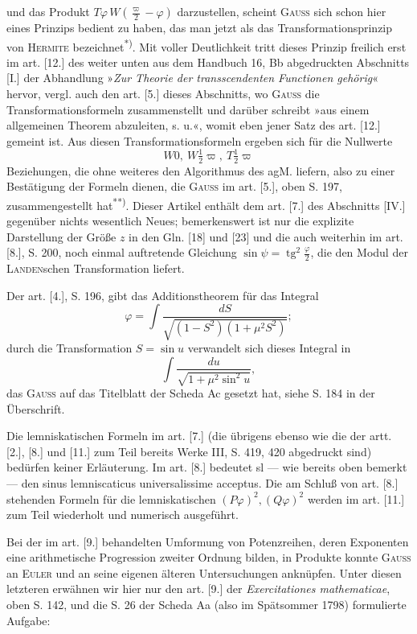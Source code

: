 \noindent und das Produkt $T\varphi\,W\left(\frac\varpi2-\varphi\right)$ darzustellen, scheint \textsc{Gauss} sich schon hier eines Prinzips bedient zu haben, das man jetzt als das Transformationsprinzip von \textsc{Hermite} bezeichnet\textsuperscript{*)}. Mit voller Deutlichkeit tritt dieses Prinzip freilich erst im art. [12.] des weiter unten aus dem Handbuch 16, Bb abgedruckten Abschnitts [I.] der Abhandlung »\textit{Zur Theorie der transscendenten Functionen gehörig}« hervor, vergl. auch den art. [5.] dieses Abschnitts, wo \textsc{Gauss} die Transformationsformeln zusammenstellt und darüber schreibt »aus einem allgemeinen Theorem abzuleiten, s. u.«, womit eben jener Satz des art. [12.] gemeint ist. Aus diesen Transformationsformeln ergeben sich für die Nullwerte
\[W0,\ W\tfrac12\varpi,\ T\tfrac12\varpi\]
\noindent Beziehungen, die ohne weiteres den Algorithmus des agM. liefern, also zu einer Bestätigung der Formeln dienen, die \textsc{Gauss} im art. [5.], oben S. 197, zusammengestellt hat\textsuperscript{**)}. Dieser Artikel enthält dem art. [7.] des Abschnitts [IV.] gegenüber nichts wesentlich Neues; bemerkenswert ist nur die explizite Darstellung der Größe $z$ in den Gln. [18] und [23] und die auch weiterhin im art. [8.], S. 200, noch einmal auftretende Gleichung $\sin\psi=\operatorname{tg}^2\frac\varphi2$, die den Modul der \textsc{Landen}schen Transformation liefert.
\par\indent Der art. [4.], S. 196, gibt das Additionstheorem für das Integral
\[\varphi=\int\frac{dS}{\sqrt{(1-S^2)(1+\mu^2S^2)}};\]
\noindent durch die Transformation $S=\sin u$ verwandelt sich dieses Integral in
\[\int\frac{du}{\sqrt{1+\mu^2\sin^2u}},\]
\noindent das \textsc{Gauss} auf das Titelblatt der Scheda Ac gesetzt hat, siehe S. 184 in der Überschrift.
\par\indent Die lemniskatischen Formeln im art. [7.] (die übrigens ebenso wie die der artt. [2.], [8.] und [11.] zum Teil bereits Werke III, S. 419, 420 abgedruckt sind) bedürfen keiner Erläuterung. Im art. [8.] bedeutet sl — wie bereits oben bemerkt — den sinus lemniscaticus universalissime acceptus. Die am Schluß von art. [8.] stehenden Formeln für die lemniskatischen $(P\varphi)^2,(Q\varphi)^2$ werden im art. [11.] zum Teil wiederholt und numerisch ausgeführt.
\par\indent Bei der im art. [9.] behandelten Umformung von Potenzreihen, deren Exponenten eine arithmetische Progression zweiter Ordnung bilden, in Produkte konnte \textsc{Gauss} an \textsc{Euler} und an seine eigenen älteren Untersuchungen anknüpfen. Unter diesen letzteren erwähnen wir hier nur den art. [9.] der \textit{Exercitationes mathematicae}, oben S. 142, und die S. 26 der Scheda Aa (also im Spätsommer 1798) formulierte Aufgabe:
